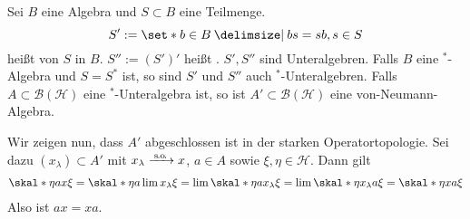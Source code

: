 \begin{definitionP}[{name=[Kommutante und Bikommutante]},label=def:65]
	Sei $B$ eine Algebra und $S \subset B$ eine Teilmenge.
	\[
		S' := \set*{b \in B \given bs=sb, s \in S}
	\]
	heißt  von $S$ in $B$. 
	$S'' := (S')'$ heißt .
	$S',S''$ sind Unteralgebren.
	Falls $B$ eine $^*$-Algebra und $S=S^*$ ist, so sind $S'$ und $S''$ auch $^*$-Unteralgebren.
	Falls $A \subset \mathcal{B}(\mathcal{H})$ eine $^*$-Unteralgebra ist, so ist $A' \subset \mathcal{B}(\mathcal{H})$ eine von-Neumann-Algebra.
\end{definitionP}
\begin{beweis}
	Wir zeigen nun, dass $A'$ abgeschlossen ist in der starken Operatortopologie.
	Sei dazu $(x_\lambda) \subset A'$ mit $x_\lambda \grenzw{\raisemath{-2pt}{\so}} x$, $a \in A$ sowie $\xi,\eta \in \mathcal{H}$.
	Dann gilt
	\begin{align}
		\skal*{\eta}{a x \xi} = \skal*{\eta}{ a \lim x_\lambda \xi} =\lim \skal*{\eta}{a x_\lambda \xi} = \lim \skal*{\eta}{x_\lambda a \xi} = \skal*{\eta}{x a \xi}
	\end{align}
	Also ist $a x= x a$.
\end{beweis}

